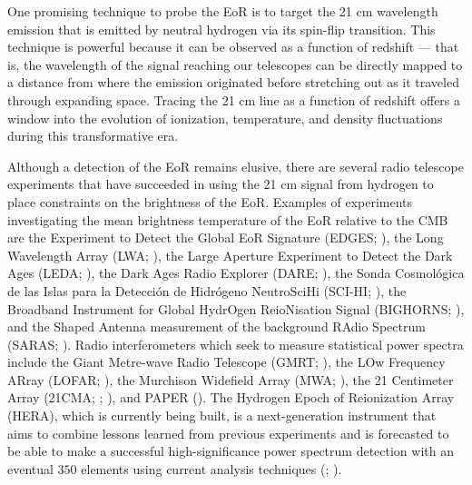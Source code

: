 \documentclass[preprint2,numberedappendix,tighten]{aastex6}  %
\begin{document}
One promising technique to probe the EoR is to target the 21 cm wavelength emission that is emitted by neutral hydrogen via its spin-flip transition. This technique is powerful because it can be observed as a function of redshift --- that is, the wavelength of the signal reaching our telescopes can be directly mapped to a distance from where the emission originated before stretching out as it traveled through expanding space. Tracing the 21 cm line as a function of redshift offers a window into the evolution of ionization, temperature, and density fluctuations during this transformative era.

Although a detection of the EoR remains elusive, there are several radio telescope experiments that have succeeded in using the 21 cm signal from hydrogen to place constraints on the brightness of the EoR. Examples of experiments investigating the mean brightness temperature of the EoR relative to the CMB are the Experiment to Detect the Global EoR Signature (EDGES; \citealt{bowman2010}), the Long Wavelength Array (LWA; \citealt{ellingson_et_al2009}),  the Large Aperture Experiment to Detect the Dark Ages (LEDA; \citealt{greenhill_bernardi2012}), the Dark Ages Radio Explorer (DARE; \citealt{burns2012}), the Sonda Cosmol\'ogica de las Islas para la Detecci\'on de Hidr\'ogeno NeutroSciHi (SCI-HI; \citealt{voytek2014}), the Broadband Instrument for Global HydrOgen ReioNisation Signal (BIGHORNS; \citealt{sokolowski2015}), and the Shaped Antenna measurement of the background RAdio Spectrum (SARAS; \citealt{patra2015}). Radio interferometers which seek to measure statistical power spectra include the Giant Metre-wave Radio Telescope (GMRT; \citealt{paciga_et_al2013}), the LOw Frequency ARray (LOFAR; \citealt{van_haarlem_et_al2013}), the Murchison Widefield Array (MWA; \citealt{tingay_et_al2013}), the 21 Centimeter Array (21CMA; \citealt{peterson_et_al2004}; \citealt{wu2009}), and PAPER (\citealt{parsons_et_al2010}). The Hydrogen Epoch of Reionization Array (HERA), which is currently being built, is a next-generation instrument that aims to combine lessons learned from previous experiments and is forecasted to be able to make a successful high-significance power spectrum detection with an eventual $350$ elements using current analysis techniques (\citealt{deboer_et_al2017}; \citealt{pober_et_al2014}).
\end{document}
